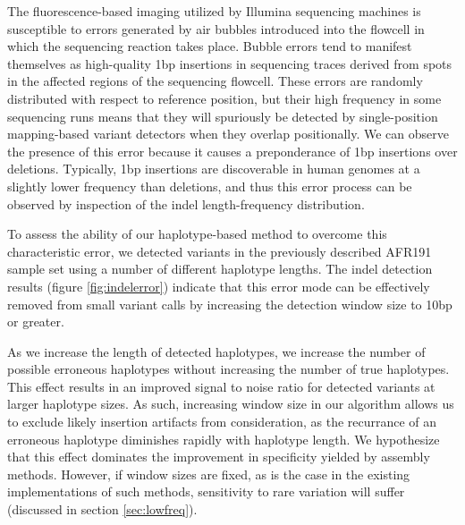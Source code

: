 \documentclass{article}
\begin{document}
The fluorescence-based imaging utilized by Illumina sequencing machines is susceptible to errors generated by air bubbles introduced into the flowcell in which the sequencing reaction takes place.  Bubble errors tend to manifest themselves as high-quality 1bp insertions in sequencing traces derived from spots in the affected regions of the sequencing flowcell.  These errors are randomly distributed with respect to reference position, but their high frequency in some sequencing runs means that they will spuriously be detected by single-position mapping-based variant detectors when they overlap positionally.  We can observe the presence of this error because it causes a preponderance of 1bp insertions over deletions.  Typically, 1bp insertions are discoverable in human genomes at a slightly lower frequency than deletions, and thus this error process can be observed by inspection of the indel length-frequency distribution.

To assess the ability of our haplotype-based method to overcome this characteristic error, we detected variants in the previously described AFR191 sample set using a number of different haplotype lengths.  The indel detection results (figure \ref{fig:indelerror}) indicate that this error mode can be effectively removed from small variant calls by increasing the detection window size to 10bp or greater.

As we increase the length of detected haplotypes, we increase the number of possible erroneous haplotypes without increasing the number of true haplotypes.  This effect results in an improved signal to noise ratio for detected variants at larger haplotype sizes.  As such, increasing window size in our algorithm allows us to exclude likely insertion artifacts from consideration, as the recurrance of an erroneous haplotype diminishes rapidly with haplotype length.  We hypothesize that this effect dominates the improvement in specificity yielded by assembly methods.  However, if window sizes are fixed, as is the case in the existing implementations of such methods, sensitivity to rare variation will suffer (discussed in section \ref{sec:lowfreq}).


\end{document}
